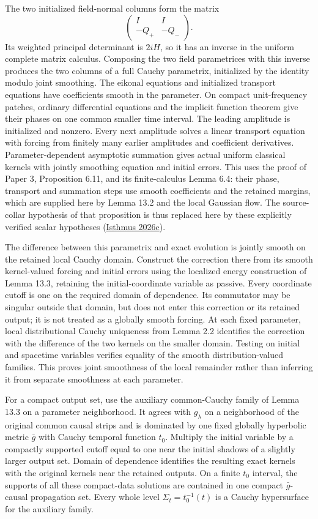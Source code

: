 \documentclass[
  english,
  11pt,
  reqno]{amsart}
\begin{document}
The two initialized field-normal columns form the matrix \[
\begin{pmatrix}I&I\\-Q_+&-Q_-\end{pmatrix}.
\] Its weighted principal determinant is \(2iH\), so it has an inverse
in the uniform complete matrix calculus. Composing the two field
parametrices with this inverse produces the two columns of a full Cauchy
parametrix, initialized by the identity modulo joint smoothing. The
eikonal equations and initialized transport equations have coefficients
smooth in the parameter. On compact unit-frequency patches, ordinary
differential equations and the implicit function theorem give their
phases on one common smaller time interval. The leading amplitude is
initialized and nonzero. Every next amplitude solves a linear transport
equation with forcing from finitely many earlier amplitudes and
coefficient derivatives. Parameter-dependent asymptotic summation gives
actual uniform classical kernels with jointly smoothing equation and
initial errors. This uses the proof of Paper 3, Proposition 6.11, and
its finite-calculus Lemma 6.4: their phase, transport and summation
steps use smooth coefficients and the retained margins, which are
supplied here by Lemma 13.2 and the local Gaussian flow. The
source-collar hypothesis of that proposition is thus replaced here by
these explicitly verified scalar hypotheses
(\hyperref[ref-IsthmusSmooth2026]{Isthmus 2026c}).

The difference between this parametrix and exact evolution is jointly
smooth on the retained local Cauchy domain. Construct the correction
there from its smooth kernel-valued forcing and initial errors using the
localized energy construction of Lemma 13.3, retaining the
initial-coordinate variable as passive. Every coordinate cutoff is one
on the required domain of dependence. Its commutator may be singular
outside that domain, but does not enter this correction or its retained
output; it is not treated as a globally smooth forcing. At each fixed
parameter, local distributional Cauchy uniqueness from Lemma 2.2
identifies the correction with the difference of the two kernels on the
smaller domain. Testing on initial and spacetime variables verifies
equality of the smooth distribution-valued families. This proves joint
smoothness of the local remainder rather than inferring it from separate
smoothness at each parameter.

For a compact output set, use the auxiliary common-Cauchy family of
Lemma 13.3 on a parameter neighborhood. It agrees with \(g_\lambda\) on
a neighborhood of the original common causal strips and is dominated by
one fixed globally hyperbolic metric \(\bar g\) with Cauchy temporal
function \(t_0\). Multiply the initial variable by a compactly supported
cutoff equal to one near the initial shadows of a slightly larger output
set. Domain of dependence identifies the resulting exact kernels with
the original kernels near the retained outputs. On a finite \(t_0\)
interval, the supports of all these compact-data solutions are contained
in one compact \(\bar g\)-causal propagation set. Every whole level
\(\Sigma_t=t_0^{-1}(t)\) is a Cauchy hypersurface for the auxiliary
family.
\end{document}
